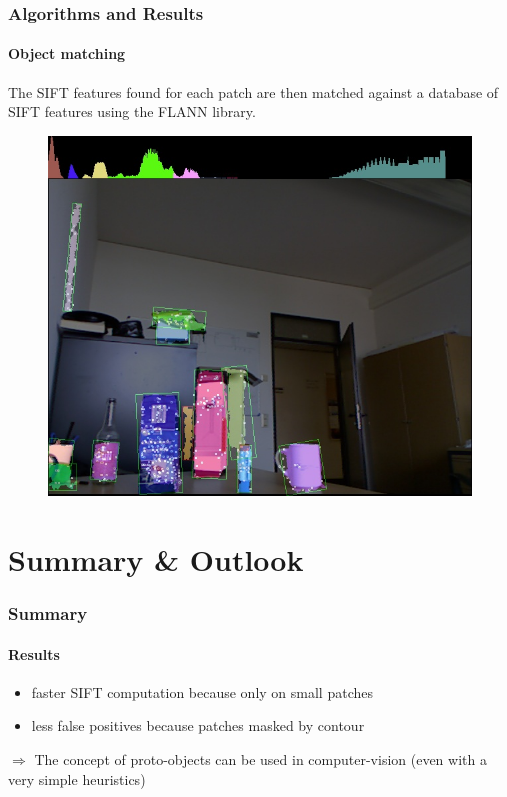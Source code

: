 \documentclass[]{beamer}
\begin{document}
\begin{frame}
    \frametitle{Algorithms and Results}
    \framesubtitle{Object matching}
    
    The SIFT features found for each patch are then matched against a database of SIFT features using the FLANN library.
    \begin{figure}[h]
        \centering
            \includegraphics[height=0.6\textheight]{../images/contours_keypoints.jpg}
    \end{figure}
\end{frame}


\section{Summary \& Outlook} %
\label{sg:sec:outlook}

\begin{frame}
    \frametitle{Summary}
    \framesubtitle{Results}
    
    \begin{itemize}
        \item<+-> faster SIFT computation because only on small patches
        \item<+-> less false positives because patches masked by contour
    \end{itemize}
    
    \vspace{1cm}
    $\Rightarrow$ The concept of proto-objects can be used in computer-vision (even with a very simple heuristics)
    
\end{frame}
\end{document}
